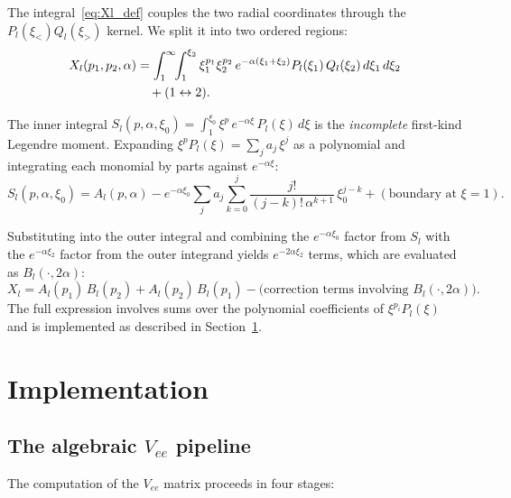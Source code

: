 \documentclass[aps,pra,twocolumn,superscriptaddress,longbibliography]{revtex4-2}
\begin{document}
The integral~\eqref{eq:Xl_def} couples the two radial
coordinates through the $P_l(\xi_<) Q_l(\xi_>)$ kernel.
We split it into two ordered regions:
\begin{align}
  X_l(p_1, p_2, \alpha) &=
    \int_1^\infty\!\!\int_1^{\xi_2}
      \xi_1^{p_1}\xi_2^{p_2}\,e^{-\alpha(\xi_1+\xi_2)}
      P_l(\xi_1)\,Q_l(\xi_2)\,d\xi_1\,d\xi_2 \notag\\
    &\quad+ (1 \leftrightarrow 2).
  \label{eq:Xl_split}
\end{align}

The inner integral
$S_l(p,\alpha,\xi_0) = \int_1^{\xi_0}\xi^p\,e^{-\alpha\xi}\,
P_l(\xi)\,d\xi$
is the \emph{incomplete} first-kind Legendre moment.  Expanding
$\xi^p P_l(\xi) = \sum_j a_j\,\xi^j$ as a polynomial and
integrating each monomial by parts against $e^{-\alpha\xi}$:
\begin{equation}
  S_l(p,\alpha,\xi_0) = A_l(p,\alpha) - e^{-\alpha\xi_0}
  \sum_j a_j\sum_{k=0}^{j}\frac{j!}{(j-k)!\,\alpha^{k+1}}
  \,\xi_0^{j-k}
  + (\text{boundary at }\xi=1).
  \label{eq:ibp}
\end{equation}

Substituting into the outer integral and combining the
$e^{-\alpha\xi_0}$ factor from $S_l$ with the
$e^{-\alpha\xi_2}$ factor from the outer integrand yields
$e^{-2\alpha\xi_2}$ terms, which are evaluated as
$B_l(\cdot, 2\alpha)$:
\begin{equation}
  X_l = A_l(p_1)\,B_l(p_2) + A_l(p_2)\,B_l(p_1)
  - \text{(correction terms involving }B_l(\cdot, 2\alpha)\text{)}.
  \label{eq:Xl_formula}
\end{equation}
The full expression involves sums over the polynomial
coefficients of $\xi^{p_i} P_l(\xi)$ and is implemented
as described in Section~\ref{sec:implementation}.


\section{Implementation}
\label{sec:implementation}

\subsection{The algebraic \texorpdfstring{$V_{ee}$}{Vee} pipeline}

The computation of the $V_{ee}$ matrix proceeds in four stages:
\end{document}
